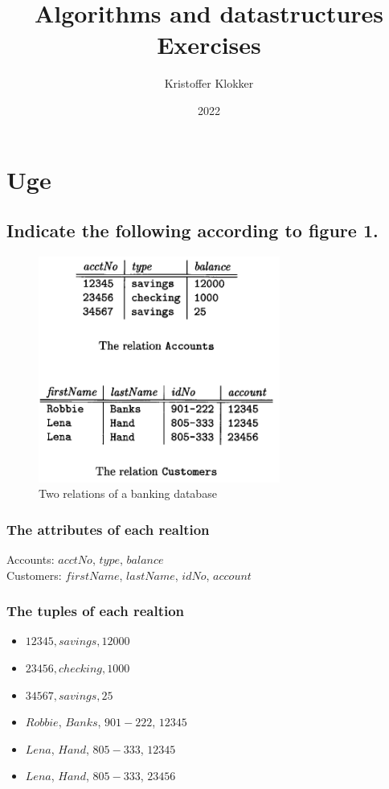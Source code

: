 \documentclass[12pt, a4paper]{article}
\title{Algorithms and datastructures\\Exercises}
\date{2022}
\author{Kristoffer Klokker}
\begin{document}
	\maketitle
	\clearpage
	\tableofcontents
	\clearpage
		\setcounter{section}{5}
		\section{Uge}
			\subsection{Indicate the following according to figure 1.}
				\begin{figure}[h!]
					\centering
					\includegraphics[width=300px]{assets/W6E1.png}
					\caption{Two relations of a banking database}
				\end{figure}
				\subsubsection{The attributes of each realtion}
					Accounts: $acctNo$, $type$, $balance$\\
					Customers: $firstName$, $lastName$, $idNo$, $account$
				\subsubsection{The tuples of each realtion}
					\begin{itemize}
						\item $12345, savings, 12000$
						\item $23456, checking, 1000$
						\item $34567, savings, 25$\\[5mm]
						\item $Robbie$, $Banks$, $901-222$, $12345$
						\item $Lena$, $Hand$, $805-333$, $12345$
						\item $Lena$, $Hand$, $805-333$, $23456$ 
					\end{itemize}
\end{document}
